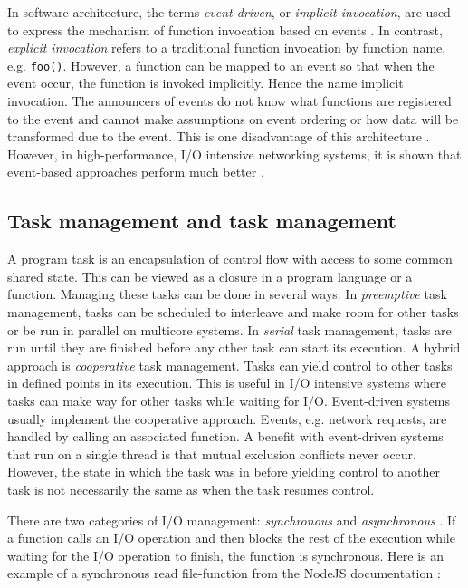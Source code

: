 In software architecture, the terms \textit{event-driven}, or \textit{implicit
invocation}, are used to express the mechanism of function invocation based on
events \cite{garlan1993introduction}. In contrast, \textit{explicit invocation}
refers to a traditional function invocation by function name, e.g.
\lstinline{foo()}. However, a function can be mapped to an event so that when
the event occur, the function is invoked implicitly. Hence the name implicit
invocation. The announcers of events do not know what functions are registered
to the event and cannot make assumptions on event ordering or how data will be
transformed due to the event. This is one disadvantage of this architecture
\cite{garlan1993introduction}. However, in high-performance, I/O intensive
networking systems, it is shown that event-based approaches perform much better
\cite{hu1997measuring}.

\subsection{Task management and task management}
\label{sec:task-management}

A program task is an encapsulation of control flow with access to some common
shared state. This can be viewed as a closure in a program language or a
function. Managing these tasks can be done in several ways. In
\textit{preemptive} task management, tasks can be scheduled to interleave and
make room for other tasks or be run in parallel on multicore systems. In
\textit{serial} task management, tasks are run until they are finished before
any other task can start its execution. A hybrid approach is
\textit{cooperative} task management. Tasks can yield control to other tasks in
defined points in its execution. This is useful in I/O intensive systems where
tasks can make way for other tasks while waiting for I/O. Event-driven systems
usually implement the cooperative approach. Events, e.g.  network requests,
are handled by calling an associated function. A benefit with event-driven
systems that run on a single thread is that mutual exclusion conflicts never
occur. However, the state in which the task was in before yielding control to
another task is not necessarily the same as when the task resumes control.
\cite{adya2002cooperative}

There are two categories of I/O management: \textit{synchronous} and
\textit{asynchronous} \cite{adya2002cooperative}. If a function calls an I/O
operation and then blocks the rest of the execution while waiting for the I/O
operation to finish, the function is synchronous. Here is an example of a
synchronous read file-function from the NodeJS documentation
\cite{nodejs-docs}:

